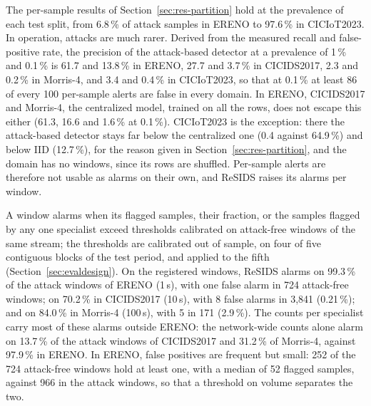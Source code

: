 The per-sample results of Section~\ref{sec:res-partition} hold at the prevalence of each test split, from 6.8\,\% of attack samples in ERENO to 97.6\,\% in CICIoT2023. In operation, attacks are much rarer. Derived from the measured recall and false-positive rate, the precision of the attack-based detector at a prevalence of 1\,\% and 0.1\,\% is 61.7 and 13.8\,\% in ERENO, 27.7 and 3.7\,\% in CICIDS2017, 2.3 and 0.2\,\% in Morris-4, and 3.4 and 0.4\,\% in CICIoT2023, so that at 0.1\,\% at least 86 of every 100 per-sample alerts are false in every domain. In ERENO, CICIDS2017 and Morris-4, the centralized model, trained on all the rows, does not escape this either (61.3, 16.6 and 1.6\,\% at 0.1\,\%). CICIoT2023 is the exception: there the attack-based detector stays far below the centralized one (0.4 against 64.9\,\%) and below IID (12.7\,\%), for the reason given in Section~\ref{sec:res-partition}, and the domain has no windows, since its rows are shuffled. Per-sample alerts are therefore not usable as alarms on their own, and ReSIDS raises its alarms per window.

A window alarms when its flagged samples, their fraction, or the samples flagged by any one specialist exceed thresholds calibrated on attack-free windows of the same stream; the thresholds are calibrated out of sample, on four of five contiguous blocks of the test period, and applied to the fifth (Section~\ref{sec:evaldesign}). On the registered windows, ReSIDS alarms on 99.3\,\% of the attack windows of ERENO (1\,s), with one false alarm in 724 attack-free windows; on 70.2\,\% in CICIDS2017 (10\,s), with 8 false alarms in 3,841 (0.21\,\%); and on 84.0\,\% in Morris-4 (100\,s), with 5 in 171 (2.9\,\%). The counts per specialist carry most of these alarms outside ERENO: the network-wide counts alone alarm on 13.7\,\% of the attack windows of CICIDS2017 and 31.2\,\% of Morris-4, against 97.9\,\% in ERENO. In ERENO, false positives are frequent but small: 252 of the 724 attack-free windows hold at least one, with a median of 52 flagged samples, against 966 in the attack windows, so that a threshold on volume separates the two.

